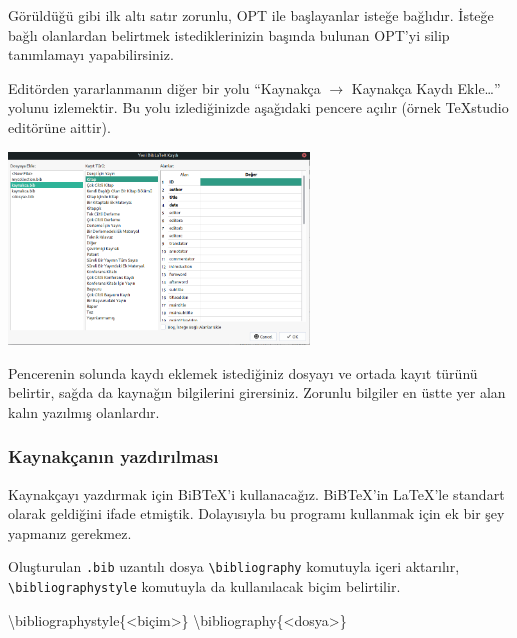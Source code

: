 \documentclass[
  10pt,
]{scrbook}
\newenvironment{Shaded}{\begin{snugshade}}{\end{snugshade}}
\newcommand{\BuiltInTok}[1]{#1}
\newcommand{\ExtensionTok}[1]{#1}
\newcommand{\NormalTok}[1]{#1}
\theoremstyle{definition}
\theoremstyle{definition}
\theoremstyle{definition}
\theoremstyle{definition}
\theoremstyle{remark}
\begin{document}
Görüldüğü gibi ilk altı satır zorunlu, OPT ile başlayanlar isteğe bağlıdır. İsteğe bağlı olanlardan belirtmek istediklerinizin başında bulunan OPT'yi silip tanımlamayı yapabilirsiniz.

Editörden yararlanmanın diğer bir yolu ``Kaynakça \(\rightarrow\) Kaynakça Kaydı Ekle\ldots{}'' yolunu izlemektir. Bu yolu izlediğinizde aşağıdaki pencere açılır (örnek TeXstudio editörüne aittir).

\includegraphics[width=0.6\textwidth,height=\textheight]{images/tex-studio.png}

Pencerenin solunda kaydı eklemek istediğiniz dosyayı ve ortada kayıt türünü belirtir, sağda da kaynağın bilgilerini girersiniz. Zorunlu bilgiler en üstte yer alan kalın yazılmış olanlardır.

\hypertarget{kaynakuxe7anux131n-yazdux131rux131lmasux131}{%
\subsubsection{Kaynakçanın yazdırılması}\label{kaynakuxe7anux131n-yazdux131rux131lmasux131}}

Kaynakçayı yazdırmak için BiBTeX'i kullanacağız. BiBTeX'in LaTeX'le standart olarak geldiğini ifade etmiştik. Dolayısıyla bu programı kullanmak için ek bir şey yapmanız gerekmez.

Oluşturulan \texttt{.bib} uzantılı dosya \texttt{\textbackslash{}bibliography} komutuyla içeri aktarılır, \texttt{\textbackslash{}bibliographystyle} komutuyla da kullanılacak biçim belirtilir.

\begin{Shaded}
\begin{Highlighting}[]
\BuiltInTok{\textbackslash{}bibliographystyle}\NormalTok{\{}\ExtensionTok{\textless{}biçim\textgreater{}}\NormalTok{\}}
\BuiltInTok{\textbackslash{}bibliography}\NormalTok{\{}\ExtensionTok{\textless{}dosya\textgreater{}}\NormalTok{\}}
\end{Highlighting}
\end{Shaded}
\end{document}
